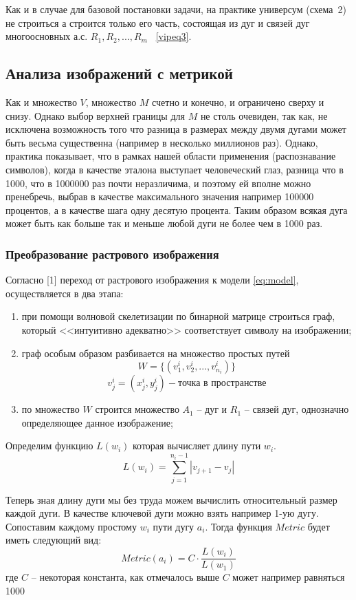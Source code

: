 \begin{remark}
Как и в случае для базовой постановки задачи, на практике универсум (схема~2) не строиться а строится только его часть, состоящая из дуг и связей дуг многоосновных а.с.  $R_1,R_2 , ..., R_m$ ~\ref{vipeq3}.
\end{remark}

\subsection{Анализа изображений с метрикой}

Как и множество $V$, множество $M$ счетно и конечно, и ограничено сверху и снизу. Однако выбор верхней границы для $M$ не столь очевиден, так как, не исключена возможность того что разница в размерах между двумя дугами может быть весьма существенна (например в несколько миллионов раз). Однако, практика показывает, что в рамках нашей области применения (распознавание символов), когда в качестве эталона выступает человеческий глаз, разница что в 1000, что в 1000000 раз почти неразличима, и поэтому ей вполне можно пренебречь, выбрав в качестве максимального значения например 100000 процентов, а в качестве шага одну десятую процента. Таким образом всякая дуга может быть как больше так и меньше любой дуги не более чем в 1000 раз.

\subsubsection{Преобразование растрового изображения}
Согласно [1] переход от растрового изображения к модели \ref{eq:model}, осуществляется в два этапа:
\begin{enumerate}
\item при помощи волновой скелетизации по бинарной матрице строиться граф, который <<интуитивно адекватно>> соответствует символу на изображении;
\item граф особым образом разбивается на множество простых путей 
$$W = \{ (v_{1}^i, v_{2}^i, ..., v_{n_i}^i) \}$$
$$v_{j}^i = (x_j^i, y_j^i) - \text{точка в пространстве} $$
\item по множество $W$ строится множество $A_1$ -- дуг и $R_1$ -- связей дуг, однозначно определяющее данное изображение;
\end{enumerate}

Определим функцию $L(w_i)$ которая вычисляет длину пути $w_i$.
$$L(w_i) = \sum\limits_{j=1}^{n_i-1}|v_{j+1}-v_j|$$

Теперь зная длину дуги мы без труда можем вычислить относительный размер каждой дуги. В качестве ключевой дуги можно взять например 1-ую дугу. Сопоставим каждому простому $w_i$ пути дугу $a_i$. Тогда функция $Metric$ будет иметь следующий вид:
$$Metric(a_i) = C\cdot\frac{L(w_i)}{L(w_1)}$$
где $C$ -- некоторая константа, как отмечалось выше $C$ может например равняться 1000

